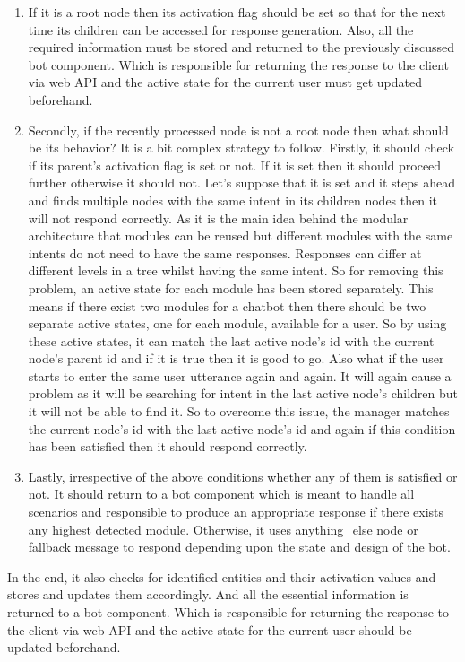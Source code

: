 \begin{enumerate}
    \item If it is a root node then its activation flag should be set so that for the next time its children can be accessed for response generation. Also, all the required information must be stored and returned to the previously discussed bot component. Which is responsible for returning the response to the client via web API and the active state for the current user must get updated beforehand. 
    \item Secondly, if the recently processed node is not a root node then what should be its behavior? It is a bit complex strategy to follow. Firstly, it should check if its parent's activation flag is set or not. If it is set then it should proceed further otherwise it should not. Let's suppose that it is set and it steps ahead and finds multiple nodes with the same intent in its children nodes then it will not respond correctly. As it is the main idea behind the modular architecture that modules can be reused but different modules with the same intents do not need to have the same responses. Responses can differ at different levels in a tree whilst having the same intent. So for removing this problem, an active state for each module has been stored separately. This means if there exist two modules for a chatbot then there should be two separate active states, one for each module, available for a user. So by using these active states, it can match the last active node's id with the current node's parent id and if it is true then it is good to go. Also what if the user starts to enter the same user utterance again and again. It will again cause a problem as it will be searching for intent in the last active node's children but it will not be able to find it. So to overcome this issue, the manager matches the current node's id with the last active node's id and again if this condition has been satisfied then it should respond correctly. 
    \item Lastly, irrespective of the above conditions whether any of them is satisfied or not. It should return to a bot component which is meant to handle all scenarios and responsible to produce an appropriate response if there exists any highest detected module. Otherwise, it uses anything\_else node or fallback message to respond depending upon the state and design of the bot.
\end{enumerate} 
\noindent
In the end, it also checks for identified entities and their activation values and stores and updates them accordingly. And all the essential information is returned to a bot component. Which is responsible for returning the response to the client via web API and the active state for the current user should be updated beforehand.

